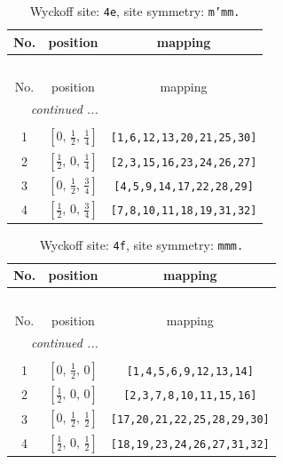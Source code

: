 \documentclass[fleqn,8pt]{jsarticle}
\begin{document}
\begin{longtable}{ccc}
\caption{Wyckoff site: {\tt 4e}, site symmetry: {\tt m'mm.}}
 \\
 \hline \hline
No. & position & mapping \\ \hline \endfirsthead

\multicolumn{2}{l}{\tablename\ \thetable{}} \\
 \hline \hline
No. & position & mapping \\ \hline \endhead

 \hline \hline
\multicolumn{2}{r}{\footnotesize\it continued ...} \\ \endfoot

 \hline \hline
\multicolumn{2}{r}{} \\ \endlastfoot

1 & $\left[ 0,\, \frac{1}{2},\, \frac{1}{4} \right]$ & {\tt [1,6,12,13,20,21,25,30]} \\ \hline
2 & $\left[ \frac{1}{2},\, 0,\, \frac{1}{4} \right]$ & {\tt [2,3,15,16,23,24,26,27]} \\ \hline
3 & $\left[ 0,\, \frac{1}{2},\, \frac{3}{4} \right]$ & {\tt [4,5,9,14,17,22,28,29]} \\ \hline
4 & $\left[ \frac{1}{2},\, 0,\, \frac{3}{4} \right]$ & {\tt [7,8,10,11,18,19,31,32]} \\
\end{longtable}
\renewcommand{\arraystretch}{1.2}
\begin{longtable}{ccc}
\caption{Wyckoff site: {\tt 4f}, site symmetry: {\tt mmm.}}
 \\
 \hline \hline
No. & position & mapping \\ \hline \endfirsthead

\multicolumn{2}{l}{\tablename\ \thetable{}} \\
 \hline \hline
No. & position & mapping \\ \hline \endhead

 \hline \hline
\multicolumn{2}{r}{\footnotesize\it continued ...} \\ \endfoot

 \hline \hline
\multicolumn{2}{r}{} \\ \endlastfoot

1 & $\left[ 0,\, \frac{1}{2},\, 0 \right]$ & {\tt [1,4,5,6,9,12,13,14]} \\ \hline
2 & $\left[ \frac{1}{2},\, 0,\, 0 \right]$ & {\tt [2,3,7,8,10,11,15,16]} \\ \hline
3 & $\left[ 0,\, \frac{1}{2},\, \frac{1}{2} \right]$ & {\tt [17,20,21,22,25,28,29,30]} \\ \hline
4 & $\left[ \frac{1}{2},\, 0,\, \frac{1}{2} \right]$ & {\tt [18,19,23,24,26,27,31,32]} \\
\end{longtable}
\end{document}
